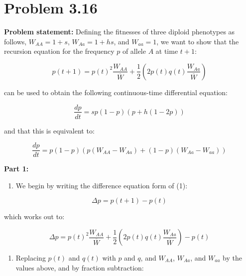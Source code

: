 \hypertarget{problem-3.16}{%
\section{Problem 3.16}\label{problem-3.16}}

\textbf{Problem statement:} Defining the fitnesses of three diploid
phenotypes as follows, \(W_{AA} = 1 + s\), \(W_{Aa} = 1 + hs\), and
\(W_{aa} = 1\), we want to show that the recursion equation for the
frequency \(p\) of allele \(A\) at time \(t+1\):

\begin{equation} p(t+1) = {p(t)}^2 \frac{W_{AA}}{\overline{W}} + \frac{1}{2} (2 p(t) q(t) \frac{W_{Aa}}{\overline{W}}) \end{equation}

can be used to obtain the following continuous-time differential
equation:

\begin{equation} \frac{dp}{dt} = sp(1-p)(p + h(1 - 2p)) \end{equation}

and that this is equivalent to:

\begin{equation} \frac{dp}{dt} = p(1-p)(p(W_{AA} - W_{Aa}) + (1-p)(W_{Aa} - W_{aa})) \end{equation}

\textbf{Part 1:}

\begin{enumerate}
\def\labelenumi{\arabic{enumi}.}
\tightlist
\item
  We begin by writing the difference equation form of (1):
\end{enumerate}

\begin{equation} \Delta p  = p(t+1) - p(t) \end{equation}

which works out to:

\begin{equation} \Delta p = {p(t)}^2 \frac{W_{AA}}{\overline{W}} + \frac{1}{2} (2 p(t) q(t) \frac{W_{Aa}}{\overline{W}}) - p(t) \end{equation}

\begin{enumerate}
\def\labelenumi{\arabic{enumi}.}
\setcounter{enumi}{1}
\tightlist
\item
  Replacing \(p(t)\) and \(q(t)\) with \(p\) and \(q\), and \(W_{AA}\),
  \(W_{Aa}\), and \(W_{aa}\) by the values above, and by fraction
  subtraction:
\end{enumerate}

